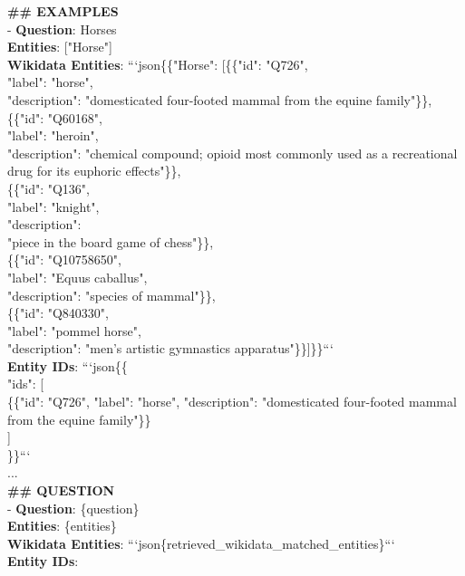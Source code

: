 {\begin{tcolorbox}[title=Entity Selection Prompt, colback=blue!5!white, colframe=blue!75!black, boxrule=0.5mm, arc=2mm, fontupper=\ttfamily, verbatim, breakable, before upper=\vspace{2mm}]
\textbf{\#\# EXAMPLES} \\
- \textbf{Question}: Horses\\
\textbf{Entities}: ["Horse"]\\
\textbf{Wikidata Entities}: ```json\{\{"Horse": [\{\{"id": "Q726", \\
"label": "horse", \\
"description": "domesticated four-footed mammal from the equine family"\}\}, \\
\{\{"id": "Q60168",\\ 
"label": "heroin", \\
"description": "chemical compound; opioid most commonly used as a recreational drug for its euphoric effects"\}\}, \\
\{\{"id": "Q136", \\
"label": "knight", \\
"description": \\
"piece in the board game of chess"\}\}, \\
\{\{"id": "Q10758650", \\
"label": "Equus caballus", \\
"description": "species of mammal"\}\}, \\
\{\{"id": "Q840330", \\
"label": "pommel horse", \\
"description": "men's artistic gymnastics apparatus"\}\}]\}\}``` \\
\textbf{Entity IDs}: ```json\{\{\\
        "ids": [\\
            \{\{"id": "Q726", "label": "horse", "description": "domesticated four-footed mammal from the equine family"\}\}\\
        ]\\
    \}\}```\\

...\\

\textbf{\#\# QUESTION} \\
- \textbf{Question}: \{question\}\\
\textbf{Entities}: \{entities\}\\
\textbf{Wikidata Entities}: ```json\{retrieved\_wikidata\_matched\_entities\}```\\
\textbf{Entity IDs}:  
    \end{tcolorbox}
}

